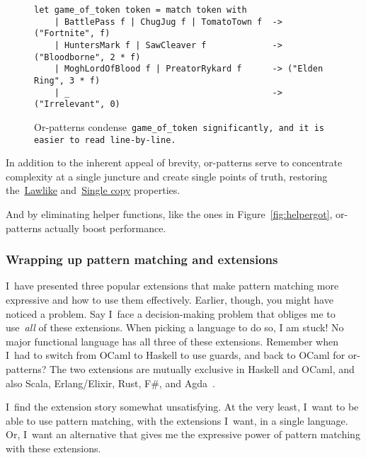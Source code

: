 \documentclass[manuscript,screen 12pt, nonacm]{acmart}
\begin{document}
    \begin{figure}
    \begin{center}
    \begin{verbatim}
let game_of_token token = match token with 
    | BattlePass f | ChugJug f | TomatoTown f  -> ("Fortnite", f)
    | HuntersMark f | SawCleaver f             -> ("Bloodborne", 2 * f)
    | MoghLordOfBlood f | PreatorRykard f      -> ("Elden Ring", 3 * f)
    | _                                        -> ("Irrelevant", 0)
    \end{verbatim}
    \end{center}    
    \caption{Or-patterns condense~\tt{game\_of\_token}
    significantly, and it is easier to read line-by-line.} 
    \label{fig:orgot}
    \end{figure}

    In addition to the inherent appeal of brevity, or-patterns serve to
    concentrate complexity at a single juncture and create single points of
    truth, restoring the~\hyperref[p1]{Lawlike} and~\hyperref[p2]{Single copy}
    properties. 
    
    And by eliminating helper functions, like the ones in
    Figure~\ref{fig:helpergot}, or-patterns actually boost performance.
      
    \subsubsection{Wrapping up pattern matching and extensions}
    
    I~have presented three popular extensions that make pattern matching more
    expressive and how to use them effectively. Earlier, though, you might have
    noticed a problem. Say I~face a decision-making problem that obliges me to
    use~\emph{all} of these extensions. When picking a language to do so, I am
    stuck! No major functional language has all three of these extensions.
    Remember when I~had to switch from OCaml to Haskell to use guards, and back
    to OCaml for or-patterns? The two extensions are mutually exclusive in
    Haskell and OCaml, and also Scala, Erlang/Elixir, Rust, F\#, and
    Agda~\citep{haskell, ocaml, scala, erlang, elixir, rust, fsharp, agda}. 


    I~find the extension story somewhat unsatisfying. At the very least, I~want
    to be able to use pattern matching, with the extensions I~want, in a single
    language. Or, I~want an alternative that gives me the expressive power of
    pattern matching with these extensions. 
\end{document}
